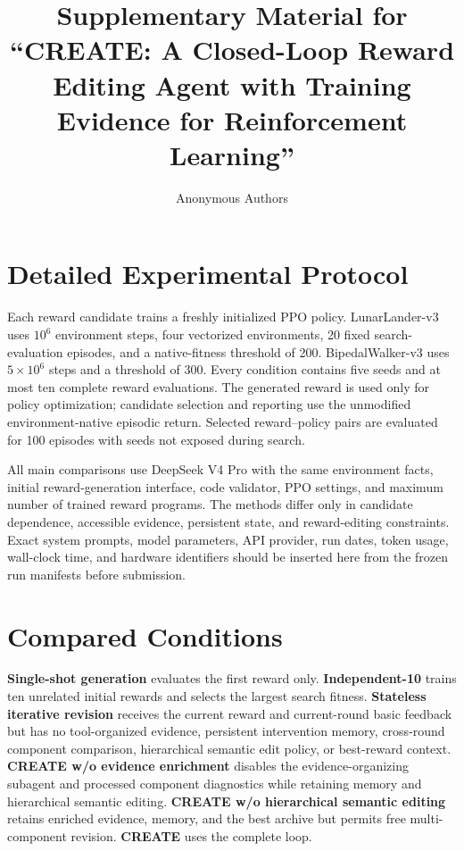 \documentclass[conference]{IEEEtran}
\title{Supplementary Material for ``CREATE: A Closed-Loop Reward Editing Agent with Training Evidence for Reinforcement Learning''}
\author{Anonymous Authors}
\begin{document}
\maketitle

\section{Detailed Experimental Protocol}
Each reward candidate trains a freshly initialized PPO policy. LunarLander-v3 uses $10^6$ environment steps, four vectorized environments, 20 fixed search-evaluation episodes, and a native-fitness threshold of 200. BipedalWalker-v3 uses $5\times10^6$ steps and a threshold of 300. Every condition contains five seeds and at most ten complete reward evaluations. The generated reward is used only for policy optimization; candidate selection and reporting use the unmodified environment-native episodic return. Selected reward--policy pairs are evaluated for 100 episodes with seeds not exposed during search.

All main comparisons use DeepSeek V4 Pro with the same environment facts, initial reward-generation interface, code validator, PPO settings, and maximum number of trained reward programs. The methods differ only in candidate dependence, accessible evidence, persistent state, and reward-editing constraints. Exact system prompts, model parameters, API provider, run dates, token usage, wall-clock time, and hardware identifiers should be inserted here from the frozen run manifests before submission.

\section{Compared Conditions}
\textbf{Single-shot generation} evaluates the first reward only. \textbf{Independent-10} trains ten unrelated initial rewards and selects the largest search fitness. \textbf{Stateless iterative revision} receives the current reward and current-round basic feedback but has no tool-organized evidence, persistent intervention memory, cross-round component comparison, hierarchical semantic edit policy, or best-reward context. \textbf{CREATE w/o evidence enrichment} disables the evidence-organizing subagent and processed component diagnostics while retaining memory and hierarchical semantic editing. \textbf{CREATE w/o hierarchical semantic editing} retains enriched evidence, memory, and the best archive but permits free multi-component revision. \textbf{CREATE} uses the complete loop.
\end{document}
